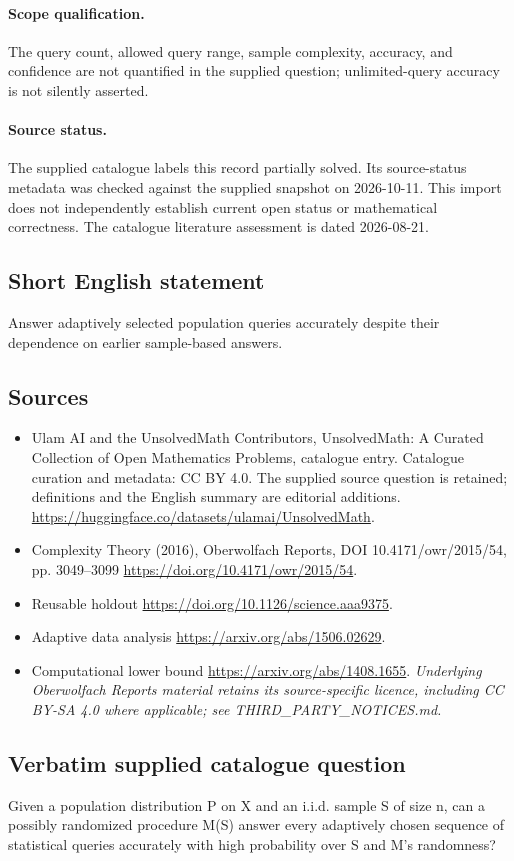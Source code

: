\documentclass[11pt]{article}
\begin{document}
\paragraph{Scope qualification.}
The query count, allowed query range, sample complexity, accuracy, and confidence are not quantified in the supplied question; unlimited-query accuracy is not silently asserted.
\paragraph{Source status.}
The supplied catalogue labels this record partially solved. Its source-status metadata was checked against the supplied snapshot on 2026-10-11. This import does not independently establish current open status or mathematical correctness. The catalogue literature assessment is dated 2026-08-21.
\subsection{Short English statement}
Answer adaptively selected population queries accurately despite their dependence on earlier sample-based answers.
\subsection{Sources}
\begin{itemize}
\item[S1] Ulam AI and the UnsolvedMath Contributors, UnsolvedMath: A Curated Collection of Open Mathematics Problems, catalogue entry. Catalogue curation and metadata: CC BY 4.0. The supplied source question is retained; definitions and the English summary are editorial additions.
\url{https://huggingface.co/datasets/ulamai/UnsolvedMath}.
\item[S2] Complexity Theory (2016), Oberwolfach Reports, DOI 10.4171/owr/2015/54, pp. 3049--3099
\url{https://doi.org/10.4171/owr/2015/54}.
\item[S3] Reusable holdout
\url{https://doi.org/10.1126/science.aaa9375}.
\item[S4] Adaptive data analysis
\url{https://arxiv.org/abs/1506.02629}.
\item[S5] Computational lower bound
\url{https://arxiv.org/abs/1408.1655}.
\textit{Underlying Oberwolfach Reports material retains its source-specific licence, including CC BY-SA 4.0 where applicable; see THIRD\_PARTY\_NOTICES.md.}
\end{itemize}
\subsection{Verbatim supplied catalogue question}
Given a population distribution P on X and an i.i.d. sample S of size n, can a possibly randomized procedure M(S) answer every adaptively chosen sequence of statistical queries accurately with high probability over S and M's randomness?
\end{document}
